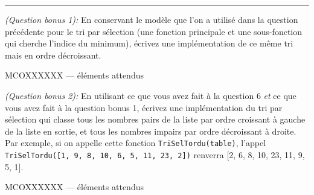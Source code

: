 \documentclass[11pt,a4paper]{exam}
\begin{document}
\begin{questions}
\begin{spacing}{1}
		
		\vspace{1.5\baselineskip} 
		\hrule
		\vspace{1.5\baselineskip} 
		
		\textit{(Question bonus 1): } En conservant le modèle que l'on a utilisé dans la question précédente pour le tri par sélection (une fonction principale et une sous-fonction qui cherche l'indice du minimum), écrivez une implémentation de ce même tri mais en ordre décroissant.
		\begin{solution}
			MCOXXXXXX --- éléments attendus
		\end{solution} 
		
		\vspace{1.5\baselineskip}
		
		\textit{(Question bonus 2): }En utilisant ce que vous avez fait à la question 6 \textit{et} ce que vous avez fait à la question bonus 1, écrivez une implémentation du tri par sélection qui classe tous les nombres pairs de la liste par ordre croissant à gauche de la liste en sortie, et tous les nombres impairs par ordre décroissant à droite. Par exemple, si on appelle cette fonction \texttt{TriSelTordu(table)}, l'appel \texttt{TriSelTordu([1, 9, 8, 10, 6, 5, 11, 23, 2])} renverra [2, 6, 8, 10, 23, 11, 9, 5, 1].
		\begin{solution}
			MCOXXXXXX --- éléments attendus
		\end{solution} 
		

\end{spacing}
\end{questions}
\end{document}
